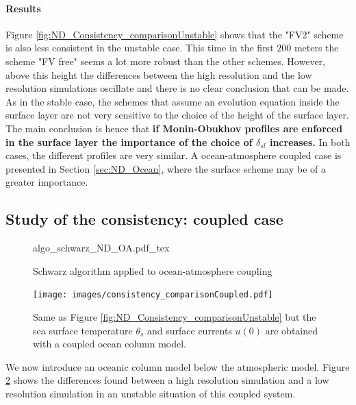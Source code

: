 \paragraph{Results}
Figure \ref{fig:ND_Consistency_comparisonUnstable}
shows that the "FV2" scheme is also less consistent
in the unstable case.
This time in the first $200$ meters the scheme "FV free" seems a lot
more robust than the other schemes.
However, above this height the differences between the high
resolution and the low resolution simulations oscillate and there
is no clear conclusion that can be made.
As in the stable case, the schemes that assume an evolution equation
inside the surface layer are not very sensitive to the choice of
the height of the surface layer.
The main conclusion is hence that
\textbf{if Monin-Obukhov profiles are enforced in the
surface layer the importance of the choice of
$\delta_{sl}$ increases.}
In both cases, the different profiles are very similar.
A ocean-atmosphere coupled case is presented in Section
\ref{sec:ND_Ocean}, where the surface scheme may be of a greater
importance.
\subsection{Study of the consistency: coupled case}
\begin{figure}
	\centering
	{algo_schwarz_ND_OA.pdf_tex}
	\caption{Schwarz algorithm applied to ocean-atmosphere
		coupling}
	\label{fig:ND_Consistency_schwarz_algo}
\end{figure}
\begin{figure}
	\centering
	\texttt{[image: images/consistency\_comparisonCoupled.pdf]}
	\caption{Same as Figure
	\ref{fig:ND_Consistency_comparisonUnstable} but the sea
	surface temperature $\theta_s$ and surface currents
	$u(0)$ are obtained with a coupled ocean column model.}
	\label{fig:ND_Consistency_comparisonCoupled}
\end{figure}
We now introduce an oceanic column model below the
atmospheric model.
Figure \ref{fig:ND_Consistency_comparisonCoupled}
shows the differences found between a high resolution simulation
and a low resolution simulation in an unstable situation of
this coupled system.

